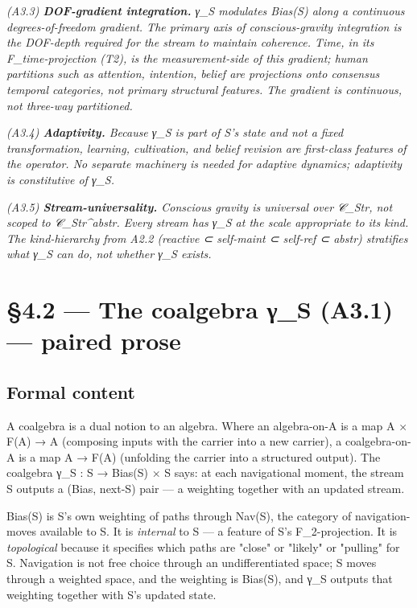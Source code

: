 \documentclass[11pt, openany]{book}
\newcommand{\sectionbreak}{\clearpage}
\begin{document}
\textit{(A3.3) \textbf{DOF-gradient integration.} γ\_\allowbreak{}S modulates Bias(S) along a continuous degrees-of-freedom gradient. The primary axis of conscious-gravity integration is the DOF-depth required for the stream to maintain coherence. Time, in its F\_\allowbreak{}time-projection (T2), is the measurement-side of this gradient; human partitions such as attention, intention, belief are projections onto consensus temporal categories, not primary structural features. The gradient is continuous, not three-way partitioned.}

\textit{(A3.4) \textbf{Adaptivity.} Because γ\_\allowbreak{}S is part of S's state and not a fixed transformation, learning, cultivation, and belief revision are first-class features of the operator. No separate machinery is needed for adaptive dynamics; adaptivity is constitutive of γ\_\allowbreak{}S.}

\textit{(A3.5) \textbf{Stream-universality.} Conscious gravity is universal over 𝒞\_\allowbreak{}Str, not scoped to 𝒞\_\allowbreak{}Str\textasciicircum{}abstr. Every stream has γ\_\allowbreak{}S at the scale appropriate to its kind. The kind-hierarchy from A2.2 (reactive ⊂ self-maint ⊂ self-ref ⊂ abstr) stratifies what γ\_\allowbreak{}S can do, not whether γ\_\allowbreak{}S exists.}

\sectionbreak

\section{§4.2 --- The coalgebra γ\_\allowbreak{}S (A3.1) --- paired prose}

\subsection{Formal content}

A coalgebra is a dual notion to an algebra. Where an algebra-on-A is a map A × F(A) → A (composing inputs with the carrier into a new carrier), a coalgebra-on-A is a map A → F(A) (unfolding the carrier into a structured output). The coalgebra γ\_\allowbreak{}S : S → Bias(S) × S says: at each navigational moment, the stream S outputs a (Bias, next-S) pair --- a weighting together with an updated stream.

Bias(S) is S's own weighting of paths through Nav(S), the category of navigation-moves available to S. It is \textit{internal} to S --- a feature of S's F\_\allowbreak{}2-projection. It is \textit{topological} because it specifies which paths are "close" or "likely" or "pulling" for S. Navigation is not free choice through an undifferentiated space; S moves through a weighted space, and the weighting is Bias(S), and γ\_\allowbreak{}S outputs that weighting together with S's updated state.
\end{document}
